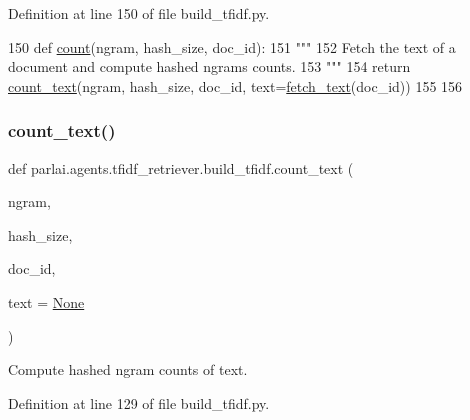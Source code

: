 Definition at line 150 of file build\+\_\+tfidf.\+py.


\begin{DoxyCode}
150 \textcolor{keyword}{def }\hyperlink{namespaceparlai_1_1agents_1_1tfidf__retriever_1_1build__tfidf_a7fc352c82f4a875b23fec3b046027039}{count}(ngram, hash\_size, doc\_id):
151     \textcolor{stringliteral}{"""}
152 \textcolor{stringliteral}{    Fetch the text of a document and compute hashed ngrams counts.}
153 \textcolor{stringliteral}{    """}
154     \textcolor{keywordflow}{return} \hyperlink{namespaceparlai_1_1agents_1_1tfidf__retriever_1_1build__tfidf_a76bae1c966a21d123cb91949d6c8ec20}{count\_text}(ngram, hash\_size, doc\_id, text=\hyperlink{namespaceparlai_1_1agents_1_1tfidf__retriever_1_1build__tfidf_a8f16fdf4641c497d12c19f128ed4647a}{fetch\_text}(doc\_id))
155 
156 
\end{DoxyCode}
\mbox{\label{namespaceparlai_1_1agents_1_1tfidf__retriever_1_1build__tfidf_a76bae1c966a21d123cb91949d6c8ec20}} 
\subsubsection{\texorpdfstring{count\+\_\+text()}{count\_text()}}
{\footnotesize\ttfamily def parlai.\+agents.\+tfidf\+\_\+retriever.\+build\+\_\+tfidf.\+count\+\_\+text (\begin{DoxyParamCaption}\item[{}]{ngram,  }\item[{}]{hash\+\_\+size,  }\item[{}]{doc\+\_\+id,  }\item[{}]{text = {\ttfamily \hyperlink{namespaceparlai_1_1agents_1_1tfidf__retriever_1_1build__tfidf_ad50f77b70c0e27d3304395c58e9212c4}{None}} }\end{DoxyParamCaption})}

\begin{DoxyVerb}Compute hashed ngram counts of text.
\end{DoxyVerb}
 

Definition at line 129 of file build\+\_\+tfidf.\+py.


